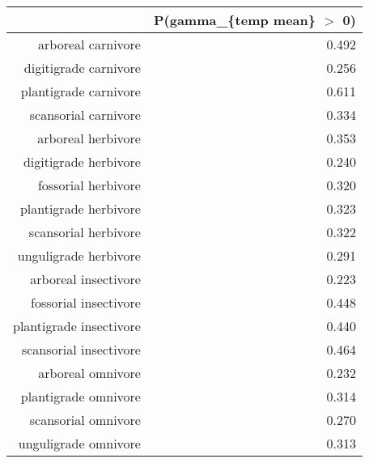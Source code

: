 \begin{table}[ht]
\centering
\begin{tabular}{rr}
  \hline
 & P(gamma\_\{temp mean\} $>$ 0) \\ 
  \hline
arboreal carnivore & 0.492 \\ 
  digitigrade carnivore & 0.256 \\ 
  plantigrade carnivore & 0.611 \\ 
  scansorial carnivore & 0.334 \\ 
  arboreal herbivore & 0.353 \\ 
  digitigrade herbivore & 0.240 \\ 
  fossorial herbivore & 0.320 \\ 
  plantigrade herbivore & 0.323 \\ 
  scansorial herbivore & 0.322 \\ 
  unguligrade herbivore & 0.291 \\ 
  arboreal insectivore & 0.223 \\ 
  fossorial insectivore & 0.448 \\ 
  plantigrade insectivore & 0.440 \\ 
  scansorial insectivore & 0.464 \\ 
  arboreal omnivore & 0.232 \\ 
  plantigrade omnivore & 0.314 \\ 
  scansorial omnivore & 0.270 \\ 
  unguligrade omnivore & 0.313 \\ 
   \hline
\end{tabular}
\label{tab:origin_temp}
\end{table}
